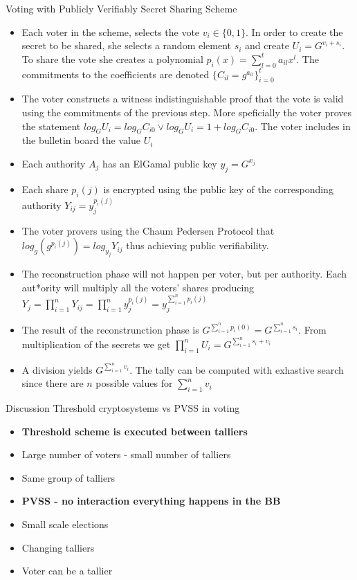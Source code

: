 \documentclass{beamer}
\begin{document}
\begin{frame}[allowframebreaks]{Voting with Publicly Verifiably Secret Sharing Scheme}
\begin{itemize}
\item Each voter in the scheme, selects the vote $v_i \in \{ 0,1 \}$. In order to create the secret to be shared, she selects a random element $s_i$ and create $U_i = G^{v_i + s_i}$. To share the vote she creates a polynomial $p_i(x) = \sum_{l=0}^t a_{il}x^l$. The commitments to the coefficients are denoted $\{ C_{il} = g^{a_{il}} \}_{i=0}^t $
\item The voter constructs a witness indistinguishable proof \cite{CDS94} that the vote is valid using the commitments of the previous step. More speficially the voter proves the statement $log_G U_i = log_G C_{i0} \vee log_G U_i = 1+log_G C_{i0}$. The voter includes in the bulletin board the value $U_i$
\item Each authority $A_j$ has an ElGamal public key $y_j=G^{x_j}$
\item Each share $p_i(j)$ is encrypted using the public key of the corresponding authority $Y_{ij} = y_j^{p_i(j)}$
\item The voter provers using the Chaum Pedersen Protocol that $log_g (g^{p_i(j)}) = log_{y_j} Y_{ij}$ thus achieving public verifiability.
\item The reconstruction phase will not happen per voter, but per authority. Each aut*ority will multiply all the voters' shares producing 
$Y_j = \prod_{i=1}^n Y_{ij} = \prod_{i=1}^n y_j^{p_i(j)} = y_j^{\sum_{i=1}^n p_i(j)}$
\item The result of the reconstrunction phase is $G^{\sum_{i=1}^n p_i(0)} = G^{\sum_{i=1}^n s_i}$. From multiplication of the secrets we get $\prod_{i=1}^n U_i = G^{\sum_{i=1}^n s_i+v_i}$
\item A division yields $G^{\sum_{i=1}^n v_i}$. The tally can be computed with exhastive search since there are $n$ possible values for $\sum_{i=1}^n v_i$
\end{itemize}

\end{frame}

\begin{frame}{Discussion}
Threshold cryptosystems vs PVSS in voting
\begin{itemize}
\item \textbf{Threshold scheme is executed between talliers}
\item Large number of voters - small number of talliers
\item Same group of talliers
\item \textbf{PVSS - no interaction everything happens in the BB}
\item Small scale elections
\item Changing talliers
\item Voter can be a tallier
\end{itemize}
\end{frame} 
\end{document}

